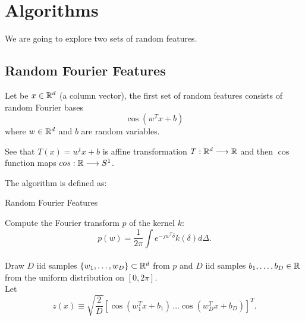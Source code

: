 \chapter{Algorithms}


We are going to explore two sets of random features. 

\section{Random Fourier Features}

Let be $x \in \mathbb{R}^d$  (a column vector), the first set of random features consists of random 
Fourier bases
\begin{equation}
    \cos(w^T x + b) 
\end{equation}
where $w \in \mathbb{R}^d$  and $b$ are random variables. 

See that $T(x) = w^t x +b$ is affine transformation
$T:\mathbb{R}^d \longrightarrow \mathbb{R}$  and then $\cos$ function maps
$cos: \mathbb{R}  \longrightarrow S^1$. 

The algorithm is defined as: 

\begin{algorithm}[hbt!]
    \caption{Random Fourier Features}\label{alg:two}

     Compute the Fourier transform $p$ of the kernel $k$: 
    \begin{equation}\label{eq:fourier_transformation}
        p(w) = \frac{1}{2 \pi}
        \int
        e^{-jw^T \delta}k(\delta) 
        d \Delta. 
     \end{equation}
        \\
     Draw $D$ iid samples 
     $\{w_1, \ldots, w_D \} \subset \mathbb{R}^d$ from $p$ and
     $D$ iid samples $b_1, \ldots, b_D \in \mathbb{R}$
     from the uniform distribution on 
     $[0, 2\pi]$. 
     \\
     Let 
     \begin{equation}
        z(x)
        \equiv
        \sqrt{\frac{2}{D}}
        \left[ 
            \cos(w_1^T x + b_1) 
            \, 
            \ldots
            \cos(w_D^T x + b_D) 
            \right]^T. 
     \end{equation}
    \end{algorithm}


